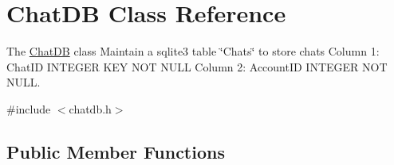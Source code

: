 \hypertarget{classChatDB}{}\section{Chat\+DB Class Reference}
\label{classChatDB}


The \hyperlink{classChatDB}{Chat\+DB} class Maintain a sqlite3 table \char`\"{}\+Chats\char`\"{} to store chats Column 1\+: Chat\+ID I\+N\+T\+E\+G\+ER K\+EY N\+OT N\+U\+LL Column 2\+: Account\+ID I\+N\+T\+E\+G\+ER N\+OT N\+U\+LL.  




{\ttfamily \#include $<$chatdb.\+h$>$}

\subsection*{Public Member Functions}
